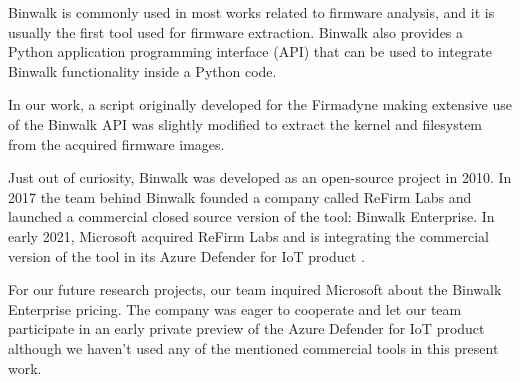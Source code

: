 \begin{table}[h]
\centering
\caption{Example of file-type signatures (magic numbers).}
\label{tab:magic-numbers}
\end{table}


Binwalk is commonly used in most works related to firmware analysis, and it is usually the first tool used for firmware extraction. Binwalk also provides a Python application programming interface (API) that can be used to integrate Binwalk functionality inside a Python code.

In our work, a script originally developed for the Firmadyne \cite{firmadyne} making extensive use of the Binwalk API was slightly modified to extract the kernel and filesystem from the acquired firmware images.

Just out of curiosity, Binwalk was developed as an open-source project in 2010. In 2017 the team behind Binwalk founded a company called ReFirm Labs and launched a commercial closed source version of the tool: Binwalk Enterprise. In early 2021, Microsoft acquired ReFirm Labs and is integrating the commercial version of the tool in its Azure Defender for IoT product \cite{microsoft-refirmlabs}.

For our future research projects, our team inquired Microsoft about the Binwalk Enterprise pricing. The company was eager to cooperate and let our team participate in an early private preview of the Azure Defender for IoT product although we haven't used any of the mentioned commercial tools in this present work.

